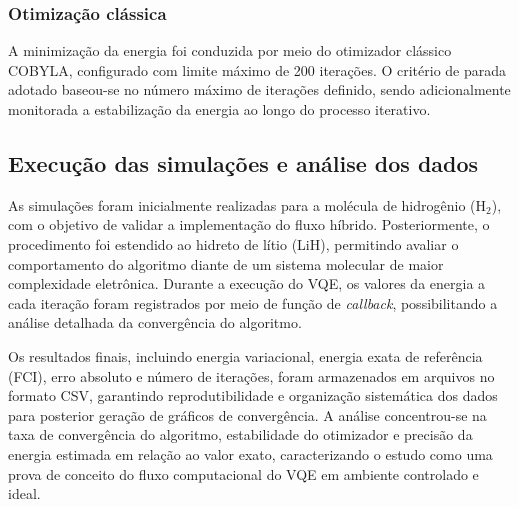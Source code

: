 \subsubsection{Otimização clássica}

A minimização da energia foi conduzida por meio do otimizador clássico 
COBYLA, configurado com limite máximo de 200 iterações. O critério de parada 
adotado baseou-se no número máximo de iterações definido, sendo 
adicionalmente monitorada a estabilização da energia ao longo do processo 
iterativo.

\subsection{Execução das simulações e análise dos dados}

As simulações foram inicialmente realizadas para a molécula de hidrogênio 
(H$_2$), com o objetivo de validar a implementação do fluxo híbrido. 
Posteriormente, o procedimento foi estendido ao hidreto de lítio (LiH), 
permitindo avaliar o comportamento do algoritmo diante de um sistema 
molecular de maior complexidade eletrônica.
Durante a execução do VQE, os valores da energia a cada iteração foram 
registrados por meio de função de \textit{callback}, possibilitando a 
análise detalhada da convergência do algoritmo.

Os resultados finais, incluindo energia variacional, energia exata de 
referência (FCI), erro absoluto e número de iterações, foram armazenados em 
arquivos no formato CSV, garantindo reprodutibilidade e organização 
sistemática dos dados para posterior geração de gráficos de convergência.
A análise concentrou-se na taxa de convergência do algoritmo, estabilidade 
do otimizador e precisão da energia estimada em relação ao valor exato, 
caracterizando o estudo como uma prova de conceito do fluxo computacional do 
VQE em ambiente controlado e ideal.